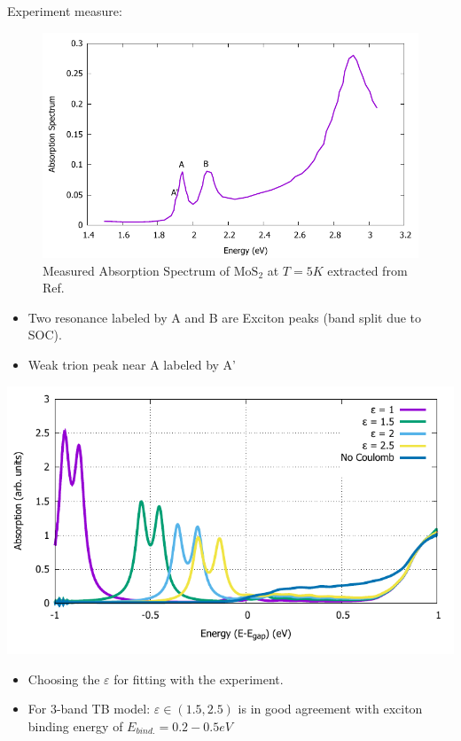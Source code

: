\documentclass{beamer}
\begin{document}
	\begin{frame}
		Experiment measure:
		\begin{multicols}{2}
		\begin{figure}
	\includegraphics[width = 1\linewidth]{images/Experiment.pdf}
	\caption{Measured Absorption Spectrum of $\mathrm{MoS}_2$ at $T=5K$  extracted from Ref.  \autocite{zhang_absorption_2014}}
	\end{figure}
	\columnbreak
	\begin{itemize}
		\item Two resonance labeled by A and B are Exciton peaks (band split due to SOC).
		\item Weak trion peak near A labeled by A'
	\end{itemize}
	\end{multicols}
	\end{frame}
\begin{frame}
	\begin{center}		
		\includegraphics[width=0.8\linewidth]{images/varyepsilon.pdf}
	\end{center}
	\begin{itemize}
		\item Choosing the $\varepsilon$ for fitting with the experiment.
		\item For 3-band TB model: $\varepsilon \in (1.5,2.5)$ is in good agreement with exciton binding energy of $E_{bind.}= 0.2-0.5 eV$ 
	\end{itemize}
\end{frame}
\end{document}

